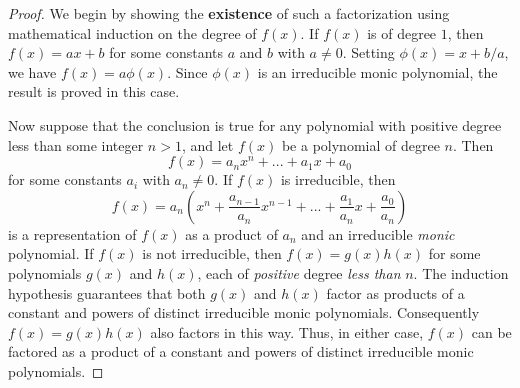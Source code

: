 \begin{proof}
We begin by showing the \textbf{existence} of such a factorization using mathematical induction on the degree of \(f(x)\).
If \(f(x)\) is of degree \(1\), then \(f(x) = ax + b\) for some constants \(a\) and \(b\) with \(a \ne 0\).
Setting \(\phi(x) = x + b/a\), we have \(f(x) = a\phi(x)\).
Since \(\phi(x)\) is an irreducible monic polynomial, the result is proved in this case.

Now suppose that the conclusion is true for any polynomial with positive degree less than some integer \(n > 1\), and let \(f(x)\) be a polynomial of degree \(n\).
Then
\[
    f(x) = a_n x^n + ... + a_1 x + a_0
\]
for some constants \(a_i\) with \(a_n \ne 0\).
If \(f(x)\) is irreducible, then
\[
    f(x) = a_n \left( x^n + \frac{a_{n-1}}{a_n} x^{n - 1} + ... + \frac{a_1}{a_n} x +  \frac{a_0}{a_n} \right)
\]
is a representation of \(f(x)\) as a product of \(a_{n}\) and an irreducible \emph{monic} polynomial.
If \(f(x)\) is not irreducible, then \(f(x) = g(x)h(x)\) for some polynomials \(g(x)\) and \(h(x)\), each of \emph{positive} degree \emph{less than} \(n\).
The induction hypothesis guarantees that both \(g(x)\) and \(h(x)\) factor as products of a constant and powers of distinct irreducible monic polynomials.
Consequently \(f(x) = g(x)h(x)\) also factors in this way.
Thus, in either case, \(f(x)\) can be factored as a product of a constant and powers of distinct irreducible monic polynomials.


\end{proof}
